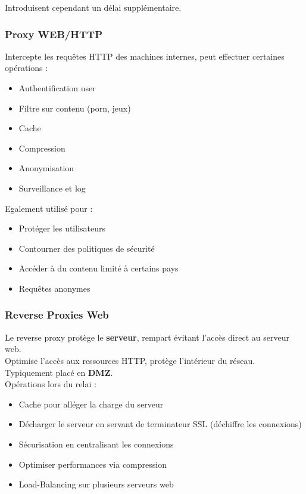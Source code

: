 \documentclass{report}
\begin{document}
			Introduisent cependant un délai supplémentaire.\\

			\subsubsection{Proxy WEB/HTTP}

				Intercepte les requêtes HTTP des machines internes, peut effectuer certaines opérations : \\

				\begin{itemize}
					\item Authentification user
					\item Filtre sur contenu (porn, jeux)
					\item Cache
					\item Compression
					\item Anonymisation
					\item Surveillance et log\\
				\end{itemize}

				Egalement utilisé pour : \\

				\begin{itemize}
					\item Protéger les utilisateurs
					\item Contourner des politiques de sécurité
					\item Accéder à du contenu limité à certains pays
					\item Requêtes anonymes\\
				\end{itemize}

			\subsubsection{Reverse Proxies Web}

				Le reverse proxy protège le \textbf{serveur}, rempart évitant l'accès direct au serveur web.\\
				Optimise l'accès aux ressources HTTP, protège l'intérieur du réseau.\\
				Typiquement placé en \textbf{DMZ}.\\

				Opérations lors du relai : \\
				\begin{itemize}
					\item Cache pour alléger la charge du serveur
					\item Décharger le serveur en servant de terminateur SSL (déchiffre les connexions)
					\item Sécurisation en centralisant les connexions
					\item Optimiser performances via compression
					\item Load-Balancing sur plusieurs serveurs web\\
				\end{itemize}
\end{document}
